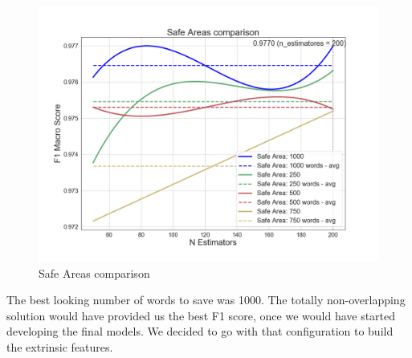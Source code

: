 \begin{figure}[htp!]
	\centering
	\includegraphics[width=\columnwidth]{chapter4/figure/dict_comparison.png}
	\caption{Safe Areas comparison}
	\label{fig:safe_areas}
\end{figure}

The best looking number of words to save was 1000. The totally non-overlapping solution would have provided us the best F1 score, once we would have started developing the final models. We decided to go with that configuration to build the extrinsic features. 

